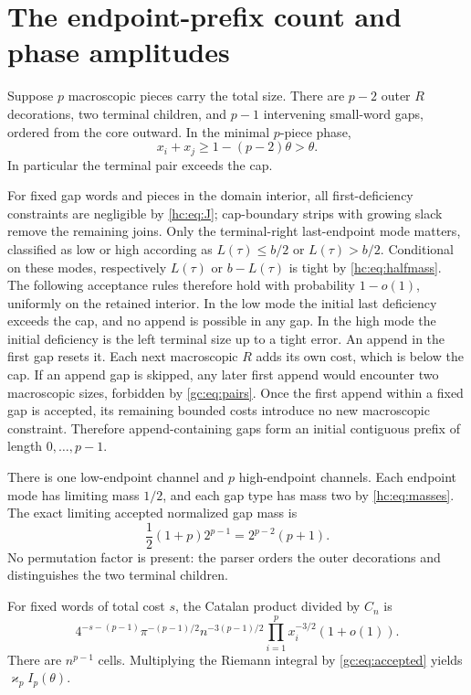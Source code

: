 \documentclass[11pt,a4paper]{article}
\theoremstyle{definition}\newaliascnt{definition}{theorem}
\theoremstyle{remark}\newaliascnt{remark}{theorem}
\begin{document}
\section{The endpoint-prefix count and phase amplitudes}
\label{gc:sec:prefix}
Suppose $p$ macroscopic pieces carry the total size. There are $p-2$ outer $R$
decorations, two terminal children, and $p-1$ intervening small-word gaps,
ordered from the core outward. In the minimal $p$-piece phase,
\begin{equation}\label{gc:eq:pairs}
 x_i+x_j\ge1-(p-2)\theta>\theta.
\end{equation}
In particular the terminal pair exceeds the cap.

For fixed gap words and pieces in the domain interior, all first-deficiency
constraints are negligible by \eqref{hc:eq:J}; cap-boundary strips with growing
slack remove the remaining joins. Only the terminal-right last-endpoint mode
matters, classified as low or high according as $L(\tau)\le b/2$ or
$L(\tau)>b/2$. Conditional on these modes, respectively $L(\tau)$ or
$b-L(\tau)$ is tight by \eqref{hc:eq:halfmass}. The following acceptance rules
therefore hold with probability $1-o(1)$, uniformly on the retained interior.
In the low mode the initial last deficiency exceeds the cap, and no append is
possible in any gap. In the high mode the initial deficiency is the left
terminal size up to a tight error. An append in the first gap resets it. Each
next macroscopic $R$ adds its own cost, which is below the cap. If an append
gap is skipped, any later first append would encounter two macroscopic sizes,
forbidden by \eqref{gc:eq:pairs}. Once the first append within a fixed gap is
accepted, its remaining bounded costs introduce no new macroscopic constraint.
Therefore append-containing gaps form an initial contiguous prefix of length
$0,\ldots,p-1$.

There is one low-endpoint channel and $p$ high-endpoint channels. Each endpoint
mode has limiting mass $1/2$, and each gap type has mass two by
\eqref{hc:eq:masses}. The exact limiting accepted normalized gap mass is
\begin{equation}\label{gc:eq:accepted}
 \frac12(1+p)2^{p-1}=2^{p-2}(p+1).
\end{equation}
No permutation factor is present: the parser orders the outer decorations and
distinguishes the two terminal children.

For fixed words of total cost $s$, the Catalan product divided by $C_n$ is
\begin{equation}\label{gc:eq:macro}
 4^{-s-(p-1)}\pi^{-(p-1)/2}n^{-3(p-1)/2}
       \prod_{i=1}^p x_i^{-3/2}(1+o(1)).
\end{equation}
There are $n^{p-1}$ cells. Multiplying the Riemann integral by
\eqref{gc:eq:accepted} yields $\varkappa_pI_p(\theta)$.
\end{document}
